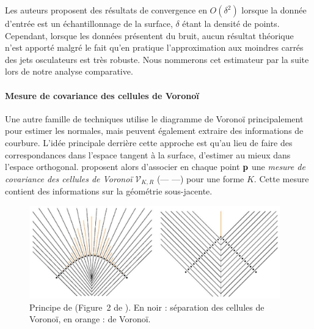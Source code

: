 %
%
%
Les auteurs proposent des résultats de convergence en $O(\delta^2)$ lorsque la
donnée d'entrée est un échantillonnage de la surface, $\delta$ étant la densité
de points. Cependant, lorsque les données présentent du bruit, aucun résultat
théorique n'est apporté malgré le fait qu'en pratique l'approximation aux
moindres carrés des jets osculateurs est très robuste.
%
Nous nommerons cet estimateur par la suite \JetFitting lors de notre analyse comparative.
%
\paragraph{Mesure de covariance des cellules de Voronoï}
%
Une autre famille de techniques utilise le diagramme de Voronoï
\cite{Alliez2007,Merigot2009,Merigot2011,Cuel2014DGCI} principalement pour
estimer les normales, mais peuvent également extraire des informations de
courbure. L'idée principale derrière cette approche est qu'au lieu de faire des
correspondances dans l'espace tangent à la surface, d'estimer au mieux dans
l'espace orthogonal.  proposent alors d'associer
en chaque point $\mathbf{p}$ une \emph{mesure de covariance des cellules de Voronoï}
$\mathcal{V}_{K,R}$ (\VCMM --- \VCM ---) pour une forme $K$. Cette mesure
contient des informations sur la géométrie sous-jacente.
%

\begin{figure}[ht]{
    \begin{center}
    \includegraphics[height=4cm]{images/Feature/VCM}
    \end{center}}
    \caption[Principe de \VCM.]{Principe de \VCM (Figure~2 de \cite{Merigot2011}). En noir : séparation des cellules de Voronoï, en orange :  de Voronoï.
      \label{fig:mellado-VCM}}
\end{figure}

